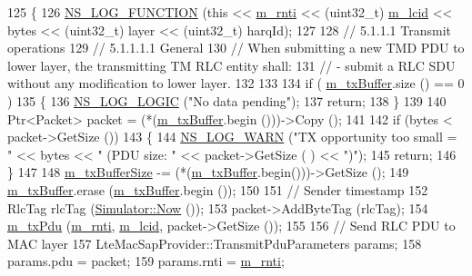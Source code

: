\begin{DoxyCode}
125 \{
126   \hyperlink{log-macros-disabled_8h_a90b90d5bad1f39cb1b64923ea94c0761}{NS\_LOG\_FUNCTION} (\textcolor{keyword}{this} << \hyperlink{classns3_1_1LteRlc_a48ab0a78e7f2687337075b1c8832df70}{m\_rnti} << (uint32\_t) \hyperlink{classns3_1_1LteRlc_a051085e9b27883e7ba4b98ad7242fd8a}{m\_lcid} << bytes  << (uint32\_t) 
      layer << (uint32\_t) harqId);
127 
128   \textcolor{comment}{// 5.1.1.1 Transmit operations }
129   \textcolor{comment}{// 5.1.1.1.1 General}
130   \textcolor{comment}{// When submitting a new TMD PDU to lower layer, the transmitting TM RLC entity shall:}
131   \textcolor{comment}{// - submit a RLC SDU without any modification to lower layer.}
132 
133 
134   \textcolor{keywordflow}{if} ( \hyperlink{classns3_1_1LteRlcTm_a01ff97b4fb7201dd3feeab5a07703cbf}{m\_txBuffer}.size () == 0 )
135     \{
136       \hyperlink{group__logging_ga88acd260151caf2db9c0fc84997f45ce}{NS\_LOG\_LOGIC} (\textcolor{stringliteral}{"No data pending"});
137       \textcolor{keywordflow}{return};
138     \}
139 
140   Ptr<Packet> packet = (*(\hyperlink{classns3_1_1LteRlcTm_a01ff97b4fb7201dd3feeab5a07703cbf}{m\_txBuffer}.begin ()))->Copy ();
141 
142   \textcolor{keywordflow}{if} (bytes < packet->GetSize ())
143     \{
144       \hyperlink{group__logging_gade7208b4009cdf0e25783cd26766f559}{NS\_LOG\_WARN} (\textcolor{stringliteral}{"TX opportunity too small = "} << bytes << \textcolor{stringliteral}{" (PDU size: "} << packet->GetSize (
      ) << \textcolor{stringliteral}{")"});
145       \textcolor{keywordflow}{return};
146     \}
147 
148   \hyperlink{classns3_1_1LteRlcTm_a8be5f1fa70a1c3f6f13450a46e2d34a3}{m\_txBufferSize} -= (*(\hyperlink{classns3_1_1LteRlcTm_a01ff97b4fb7201dd3feeab5a07703cbf}{m\_txBuffer}.begin()))->GetSize ();
149   \hyperlink{classns3_1_1LteRlcTm_a01ff97b4fb7201dd3feeab5a07703cbf}{m\_txBuffer}.erase (\hyperlink{classns3_1_1LteRlcTm_a01ff97b4fb7201dd3feeab5a07703cbf}{m\_txBuffer}.begin ());
150  
151   \textcolor{comment}{// Sender timestamp}
152   RlcTag rlcTag (\hyperlink{classns3_1_1Simulator_ac3178fa975b419f7875e7105be122800}{Simulator::Now} ());
153   packet->AddByteTag (rlcTag);
154   \hyperlink{classns3_1_1LteRlc_aa14f9d8b8828d0b0859f1870ae1248e6}{m\_txPdu} (\hyperlink{classns3_1_1LteRlc_a48ab0a78e7f2687337075b1c8832df70}{m\_rnti}, \hyperlink{classns3_1_1LteRlc_a051085e9b27883e7ba4b98ad7242fd8a}{m\_lcid}, packet->GetSize ());
155 
156   \textcolor{comment}{// Send RLC PDU to MAC layer}
157   LteMacSapProvider::TransmitPduParameters params;
158   params.pdu = packet;
159   params.rnti = \hyperlink{classns3_1_1LteRlc_a48ab0a78e7f2687337075b1c8832df70}{m\_rnti};

\end{DoxyCode}
